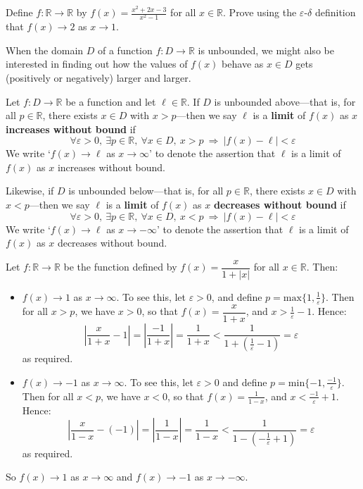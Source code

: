 \begin{exercise}
Define $f: \mathbb{R} \to \mathbb{R}$ by $f(x) = \frac{x^2 + 2x - 3}{x^2 - 1}$ for all $x \in \mathbb{R}$. Prove using the $\varepsilon$-$\delta$ definition that $f(x) \to 2$ as $x \to 1$.
\end{exercise}


When the domain $D$ of a function $f : D \to \mathbb{R}$ is unbounded, we might also be interested in finding out how the values of $f(x)$ behave as $x \in D$ gets (positively or negatively) larger and larger.

\begin{definition}
\label{defInfiniteLimitOfFunction}
Let $f : D \to \mathbb{R}$ be a function and let $\ell \in \mathbb{R}$. If $D$ is unbounded above---that is, for all $p \in \mathbb{R}$, there exists $x \in D$ with $x > p$---then we say $\ell$ is a \textbf{limit} of $f(x)$ as $x$ \textbf{increases without bound} if
\[ \forall \varepsilon > 0, ~ \exists p \in \mathbb{R},~ \forall x \in D,~ x > p ~\Rightarrow~ |f(x) - \ell| < \varepsilon\]
We write `$f(x) \to \ell$ as $x \to \infty$'  to denote the assertion that $\ell$ is a limit of $f(x)$ as $x$ increases without bound.

Likewise, if $D$ is unbounded below---that is, for all $p \in \mathbb{R}$, there exists $x \in D$ with $x < p$---then we say $\ell$ is a \textbf{limit} of $f(x)$ as $x$ \textbf{decreases without bound} if
\[ \forall \varepsilon > 0, ~ \exists p \in \mathbb{R},~ \forall x \in D,~ x < p ~\Rightarrow~ |f(x) - \ell| < \varepsilon\]
We write `$f(x) \to \ell$ as $x \to -\infty$' to denote the assertion that $\ell$ is a limit of $f(x)$ as $x$ decreases without bound.
\end{definition}

\begin{example}
Let $f : \mathbb{R} \to \mathbb{R}$ be the function defined by $f(x) = \dfrac{x}{1+|x|}$ for all $x \in \mathbb{R}$. Then:
\begin{itemize}
\item $f(x) \to 1$ as $x \to \infty$. To see this, let $\varepsilon > 0$, and define $p = \mathrm{max} \{ 1, \frac{1}{\varepsilon} \}$. Then for all $x > p$, we have $x>0$, so that $f(x) = \dfrac{x}{1+x}$, and $x > \frac{1}{\varepsilon} - 1$. Hence:
\[ \left| \frac{x}{1+x} - 1 \right| = \left| \frac{-1}{1+x} \right| = \frac{1}{1+x} < \frac{1}{1+ (\frac{1}{\varepsilon}-1) } = \varepsilon \]
as required.
\item $f(x) \to -1$ as $x \to \infty$. To see this, let $\varepsilon > 0$ and define $p = \mathrm{min} \{ -1, \frac{-1}{\varepsilon} \}$. Then for all $x < p$, we have $x<0$, so that $f(x) = \frac{1}{1-x}$, and $x < \frac{-1}{\varepsilon} + 1$. Hence:
\[ \left| \frac{x}{1-x} - (-1) \right| = \left| \frac{1}{1-x} \right| = \frac{1}{1-x} < \frac{1}{1-(-\frac{1}{\varepsilon}+1)} = \varepsilon  \]
as required.
\end{itemize}
So $f(x) \to 1$ as $x \to \infty$ and $f(x) \to -1$ as $x \to -\infty$.
\end{example}

